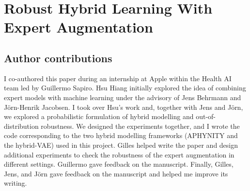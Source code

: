 %
%

\section{Robust Hybrid Learning With Expert Augmentation}

\subsection{Author contributions}
I co-authored this paper during an internship at Apple within the Health AI team led by Guillermo Sapiro. Hsu Hiang initially explored the idea of combining expert models with machine learning under the advisory of Jens Behrmann and J{\"o}rn-Henrik Jacobsen. I took over Hsu's work and, together with Jens and J{\"o}rn, we explored a probabilistic formulation of hybrid modelling and out-of-distribution robustness. We designed the experiments together, and I wrote the code corresponding to the two hybrid modelling frameworks (APHYNITY and the hybrid-VAE) used in this project. Gilles helped write the paper and design additional experiments to check the robustness of the expert augmentation in different settings. Guillermo gave feedback on the manuscript. Finally, Gilles, Jens, and J{\"o}rn gave feedback on the manuscript and helped me improve its writing.

